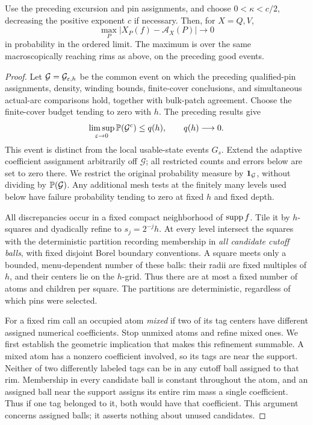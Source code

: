 \begin{lemma}\label{lemma:mixed-atoms}
Use the preceding excursion and pin assignments, and choose
$0<\kappa<c/2$, decreasing the positive exponent $c$ if necessary.
Then, for $X=Q,V$,
\[
 \max_P\left|X_P(f)-\mathcal A_X(P)\right|
                   \longrightarrow0
\]
in probability in the ordered limit.  The maximum is over the same
macroscopically reaching rims as above, on the preceding good events.
\end{lemma}

\begin{proof}
Let $\mathcal G=\mathcal G_{\varepsilon,h}$ be the common event on which
the preceding qualified-pin assignments, density, winding bounds,
finite-cover conclusions, and simultaneous actual-arc comparisons
hold, together with bulk-patch agreement. Choose the finite-cover
budget tending to zero with $h$. The preceding results give
\[
 \limsup_{\varepsilon\to0}\mathbb P(\mathcal G^c)\le q(h),
                     \qquad q(h)\longrightarrow0.
\]
This event is distinct from the local usable-state events $G_s$.
Extend the adaptive coefficient assignment arbitrarily off $\mathcal G$;
all restricted counts and errors below are set to zero there.
We restrict the original probability measure by $\mathbf 1_{\mathcal G}$,
without dividing by $\mathbb P(\mathcal G)$. Any additional mesh tests
at the finitely many levels used below have failure probability
tending to zero at fixed $h$ and fixed depth.

All discrepancies occur in a fixed compact neighborhood of
$\operatorname{supp} f$.  Tile it by $h$-squares and dyadically refine to
$s_j=2^{-j}h$.  At every level intersect the squares with the
deterministic partition recording membership in \emph{all candidate
cutoff balls}, with fixed disjoint Borel boundary conventions.  A
square meets only a bounded, menu-dependent number of these balls:
their radii are fixed multiples of $h$, and their centers lie on the
$h$-grid.  Thus there are at most a fixed number of atoms and children
per square.  The partitions are deterministic, regardless of which
pins were selected.

For a fixed rim call an occupied atom \emph{mixed} if two of its
tag centers have different assigned numerical coefficients.  Stop
unmixed atoms and refine mixed ones.  We first establish the
geometric implication that makes this refinement summable.  A mixed
atom has a nonzero coefficient involved, so its tags are near the
support.  Neither of two differently labeled tags can be in any
cutoff ball assigned to that rim.  Membership in every candidate
ball is constant throughout the atom, and an assigned ball near the
support assigns its entire rim mass a single coefficient.  Thus if
one tag belonged to it, both would have that coefficient.  This
argument concerns assigned balls; it asserts nothing about unused
candidates.


\end{proof}
